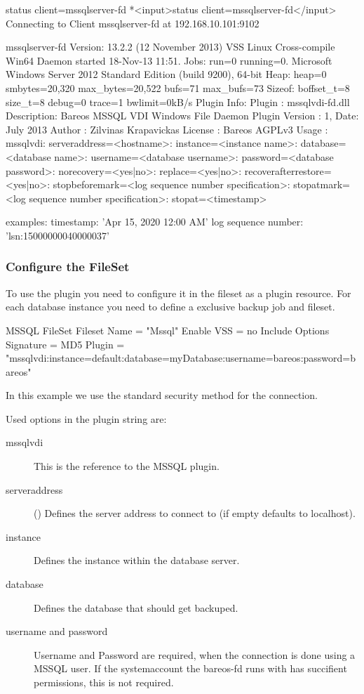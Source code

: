 \begin{bconsole}{status client=mssqlserver-fd}
*<input>status client=mssqlserver-fd</input>
Connecting to Client mssqlserver-fd at 192.168.10.101:9102

mssqlserver-fd Version: 13.2.2 (12 November 2013)  VSS Linux Cross-compile Win64
Daemon started 18-Nov-13 11:51. Jobs: run=0 running=0.
Microsoft Windows Server 2012 Standard Edition (build 9200), 64-bit
 Heap: heap=0 smbytes=20,320 max_bytes=20,522 bufs=71 max_bufs=73
 Sizeof: boffset_t=8 size_t=8 debug=0 trace=1 bwlimit=0kB/s
Plugin Info:
 Plugin     : mssqlvdi-fd.dll
 Description: Bareos MSSQL VDI Windows File Daemon Plugin
 Version    : 1, Date: July 2013
 Author     : Zilvinas Krapavickas
 License    : Bareos AGPLv3
 Usage      :
  mssqlvdi:
  serveraddress=<hostname>:
  instance=<instance name>:
  database=<database name>:
  username=<database username>:
  password=<database password>:
  norecovery=<yes|no>:
  replace=<yes|no>:
  recoverafterrestore=<yes|no>:
  stopbeforemark=<log sequence number specification>:
  stopatmark=<log sequence number specification>:
  stopat=<timestamp>

 examples:
  timestamp: 'Apr 15, 2020 12:00 AM'
  log sequence number: 'lsn:15000000040000037'
\end{bconsole}

\subsubsection{Configure the FileSet}
To use the plugin you need to configure it in the fileset as a plugin resource. For each database instance you need to define a exclusive backup job and fileset.

\begin{bconfig}{MSSQL FileSet}
Fileset {
  Name = "Mssql"
  Enable VSS = no
  Include {
    Options {
      Signature = MD5
    }
    Plugin = "mssqlvdi:instance=default:database=myDatabase:username=bareos:password=bareos"
  }
}
\end{bconfig}

In this example we use the standard security method for the connection.

Used options in the plugin string are:

\begin{description}
  \item[mssqlvdi]
  This is the reference to the MSSQL plugin.
  \item[serveraddress] () Defines the server address to connect to (if empty defaults to localhost).
  \item[instance] Defines the instance within the database server.
  \item[database] Defines the database that should get backuped.
  \item[username and password] Username and Password are required, when the connection is done using a MSSQL user. If the systemaccount the bareos-fd runs with has succifient permissions, this is not required.
\end{description}


